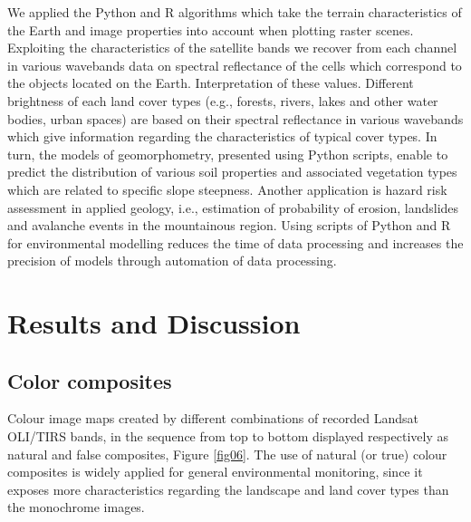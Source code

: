 \documentclass[ijgi,article,submit,pdftex,moreauthors]{Definitions/mdpi}
\begin{document}
We applied the Python and R algorithms which take the terrain characteristics of the Earth and image properties into account when plotting raster scenes. Exploiting the characteristics of the satellite bands we recover from each channel in various wavebands data on spectral reflectance of the cells which correspond to the objects located on the Earth. Interpretation of these values. Different brightness of each land cover types (e.g., forests, rivers, lakes and other water bodies, urban spaces) are based on their spectral reflectance in various wavebands which give information regarding the characteristics of typical cover types. In turn, the models of geomorphometry, presented using Python scripts, enable to predict the distribution of various soil properties and associated vegetation types which are related to specific slope steepness. Another application is  hazard risk assessment in applied geology, i.e., estimation of probability of erosion, landslides and avalanche events in the mountainous region. Using scripts of Python and R for environmental modelling reduces the time of data processing and increases the precision of models through automation of data processing.

\newpage
\section{Results and Discussion}
\subsection{Color composites}
Colour image maps created by different combinations of recorded Landsat OLI/TIRS bands, in the sequence from top to bottom displayed respectively as natural and false composites,  Figure \ref{fig06}. The use of natural (or true) colour composites is widely applied for general environmental monitoring, since it exposes more characteristics regarding the landscape and land cover types than the monochrome images. 
\end{document}
